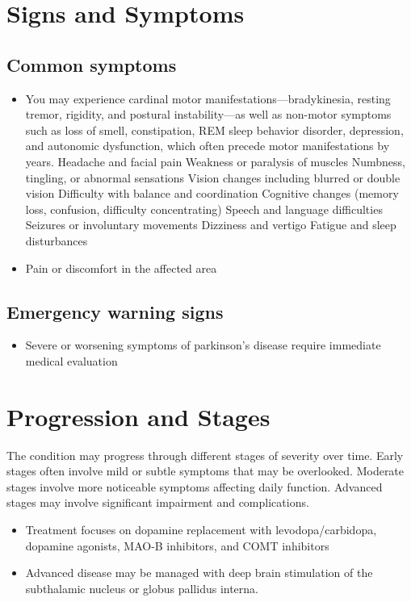 \section{Signs and Symptoms}
\subsection{Common symptoms}
\begin{itemize}[noitemsep]
  \item You may experience cardinal motor manifestations---bradykinesia, resting tremor, rigidity, and postural instability---as well as non-motor symptoms such as loss of smell, constipation, REM sleep behavior disorder, depression, and autonomic dysfunction, which often precede motor manifestations by years. Headache and facial pain Weakness or paralysis of muscles Numbness, tingling, or abnormal sensations Vision changes including blurred or double vision Difficulty with balance and coordination Cognitive changes (memory loss, confusion, difficulty concentrating) Speech and language difficulties Seizures or involuntary movements Dizziness and vertigo Fatigue and sleep disturbances
  \item Pain or discomfort in the affected area
  \end{itemize}
\subsection{Emergency warning signs}
\begin{itemize}[noitemsep]
  \item Severe or worsening symptoms of parkinson's disease require immediate medical evaluation
\end{itemize}
\section{Progression and Stages}
The condition may progress through different stages of severity over time. Early stages often involve mild or subtle symptoms that may be overlooked. Moderate stages involve more noticeable symptoms affecting daily function. Advanced stages may involve significant impairment and complications.

\begin{itemize}[noitemsep]
  \item Treatment focuses on dopamine replacement with levodopa/carbidopa, dopamine agonists, MAO-B inhibitors, and COMT inhibitors
  \item Advanced disease may be managed with deep brain stimulation of the subthalamic nucleus or globus pallidus interna.
\end{itemize}
